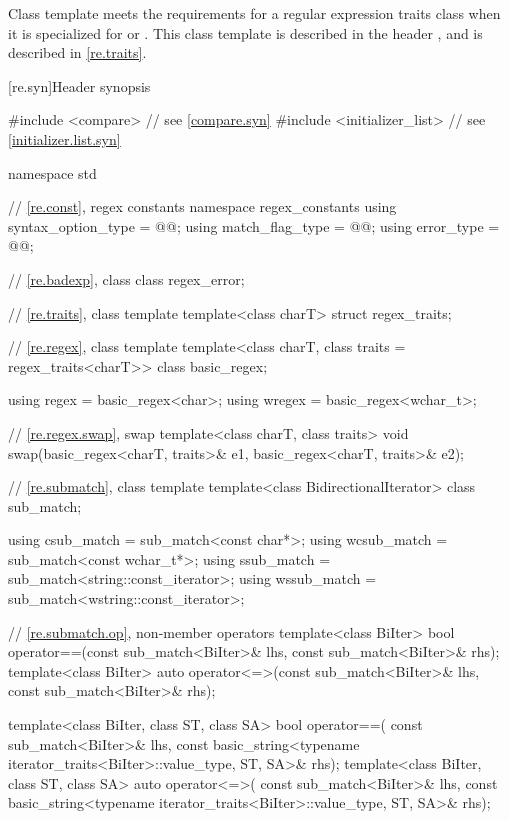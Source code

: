 \pnum
\begin{note}
Class template  meets the requirements for a
regular expression traits class when it is specialized for
 or .  This class template is described in
the header , and is described in \ref{re.traits}.
\end{note}

[re.syn]{Header  synopsis}

%
%
%
%
\begin{codeblock}
#include <compare>              // see \ref{compare.syn}
#include <initializer_list>     // see \ref{initializer.list.syn}

namespace std {
  // \ref{re.const}, regex constants
  namespace regex_constants {
    using syntax_option_type = @@;
    using match_flag_type = @@;
    using error_type = @@;
  }

  // \ref{re.badexp}, class 
  class regex_error;

  // \ref{re.traits}, class template 
  template<class charT> struct regex_traits;

  // \ref{re.regex}, class template 
  template<class charT, class traits = regex_traits<charT>> class basic_regex;

  using regex  = basic_regex<char>;
  using wregex = basic_regex<wchar_t>;

  // \ref{re.regex.swap},  swap
  template<class charT, class traits>
    void swap(basic_regex<charT, traits>& e1, basic_regex<charT, traits>& e2);

  // \ref{re.submatch}, class template 
  template<class BidirectionalIterator>
    class sub_match;

  using csub_match  = sub_match<const char*>;
  using wcsub_match = sub_match<const wchar_t*>;
  using ssub_match  = sub_match<string::const_iterator>;
  using wssub_match = sub_match<wstring::const_iterator>;

  // \ref{re.submatch.op},  non-member operators
  template<class BiIter>
    bool operator==(const sub_match<BiIter>& lhs, const sub_match<BiIter>& rhs);
  template<class BiIter>
    auto operator<=>(const sub_match<BiIter>& lhs, const sub_match<BiIter>& rhs);

  template<class BiIter, class ST, class SA>
    bool operator==(
      const sub_match<BiIter>& lhs,
      const basic_string<typename iterator_traits<BiIter>::value_type, ST, SA>& rhs);
  template<class BiIter, class ST, class SA>
    auto operator<=>(
      const sub_match<BiIter>& lhs,
      const basic_string<typename iterator_traits<BiIter>::value_type, ST, SA>& rhs);

}
\end{codeblock}
